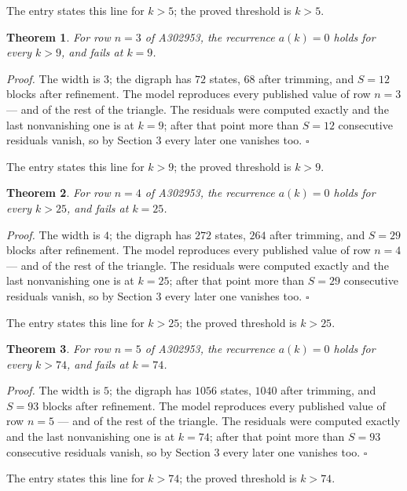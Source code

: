 \documentclass[11pt]{article}
\newtheorem{theorem}{Theorem}
\theoremstyle{definition}
\begin{document}
The entry states this line for $k > 5$; the proved threshold is $k > 5$.

\begin{theorem} For row $n = 3$ of A302953, the recurrence $a(k) = 0$ holds for every $k > 9$, and fails at $k = 9$.\end{theorem}

{\itshape Proof.} The width is $3$; the digraph has $72$ states, $68$ after trimming, and $S = 12$ blocks after refinement. The model reproduces every published value of row $n = 3$ --- and of the rest of the triangle. The residuals were computed exactly and the last nonvanishing one is at $k = 9$; after that point more than $S = 12$ consecutive residuals vanish, so by Section 3 every later one vanishes too. $\square$

The entry states this line for $k > 9$; the proved threshold is $k > 9$.

\begin{theorem} For row $n = 4$ of A302953, the recurrence $a(k) = 0$ holds for every $k > 25$, and fails at $k = 25$.\end{theorem}

{\itshape Proof.} The width is $4$; the digraph has $272$ states, $264$ after trimming, and $S = 29$ blocks after refinement. The model reproduces every published value of row $n = 4$ --- and of the rest of the triangle. The residuals were computed exactly and the last nonvanishing one is at $k = 25$; after that point more than $S = 29$ consecutive residuals vanish, so by Section 3 every later one vanishes too. $\square$

The entry states this line for $k > 25$; the proved threshold is $k > 25$.

\begin{theorem} For row $n = 5$ of A302953, the recurrence $a(k) = 0$ holds for every $k > 74$, and fails at $k = 74$.\end{theorem}

{\itshape Proof.} The width is $5$; the digraph has $1056$ states, $1040$ after trimming, and $S = 93$ blocks after refinement. The model reproduces every published value of row $n = 5$ --- and of the rest of the triangle. The residuals were computed exactly and the last nonvanishing one is at $k = 74$; after that point more than $S = 93$ consecutive residuals vanish, so by Section 3 every later one vanishes too. $\square$

The entry states this line for $k > 74$; the proved threshold is $k > 74$.
\end{document}

